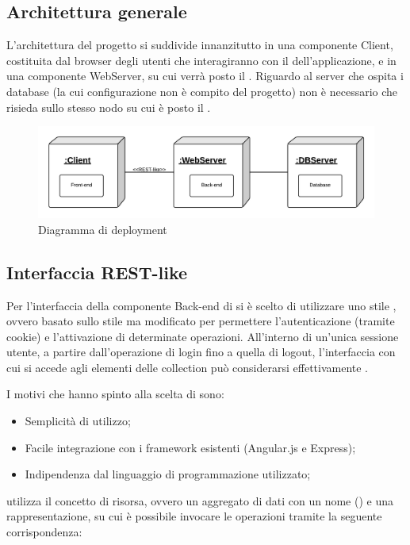 \subsection{Architettura generale}

L'architettura del progetto si suddivide innanzitutto in una componente Client, costituita dal browser degli utenti che interagiranno con il  dell'applicazione, e in una componente WebServer, su cui verrà posto il . Riguardo al server che ospita i database (la cui configurazione non è compito del progetto) non è necessario che risieda sullo stesso nodo su cui è posto il .

\begin{figure}[H]
\centering
\includegraphics[width=\textwidth]{uml/deployment.png}
\caption{Diagramma di deployment}
\end{figure}

\subsection{Interfaccia REST-like}
Per l'interfaccia della componente Back-end di \ProjectName{} si è scelto di utilizzare uno stile , ovvero basato sullo stile  ma modificato per permettere l'autenticazione (tramite cookie) e l'attivazione di determinate operazioni. All'interno di un'unica sessione utente, a partire dall'operazione di login fino a quella di logout, l'interfaccia con cui si accede agli elementi delle collection può considerarsi effettivamente .

I motivi che hanno spinto alla scelta di  sono:
\begin{itemize}
	\item Semplicità di utilizzo;
	\item Facile integrazione con i framework esistenti (Angular.js e Express);
	\item Indipendenza dal linguaggio di programmazione utilizzato;
\end{itemize}

 utilizza il concetto di risorsa, ovvero un aggregato di dati con un nome () e una rappresentazione, su cui è possibile invocare le operazioni  tramite la seguente corrispondenza:

